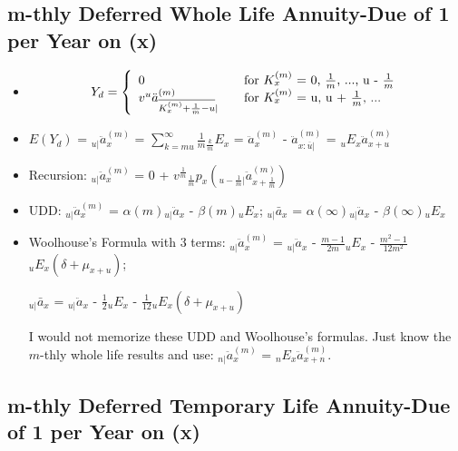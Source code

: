 \documentclass[]{book}
\begin{document}
\subsection{m-thly Deferred Whole Life Annuity-Due of 1 per Year on
(x)}\label{m-thly-deferred-whole-life-annuity-due-of-1-per-year-on-x}

\begin{itemize}
\item
  \[Y_d = \left\{
    \begin{array}{l l}
      0                       & \quad \text{for $K^{(m)}_x$ = 0, $\frac{1}{m}$, ..., u - $\frac{1}{m}$}\\
      v^u \ddot{a}^{(m)}_{\overline{K^{(m)}_x + \frac{1}{m} - u}| }             & \quad \text{for $K^{(m)}_x$ = u, u + $\frac{1}{m}$, ...}\\
    \end{array} \right.\]
\item
  \(E(Y_d)\) = \({}_{u|}\ddot{a}^{(m)}_x\) =
  \(\sum^{\infty}_{k = mu} \frac{1}{m} {}_{\frac{k}{m}}E_x\) =
  \(\ddot{a}^{(m)}_x\) - \(\ddot{a}^{(m)}_{x :\overline{u}|}\) =
  \({}_{u}E_x\)\(\ddot{a}^{(m)}_{x + u}\)
\item
  Recursion: \({}_{u|}\ddot{a}^{(m)}_x\) = 0 +
  \(v^{\frac{1}{m}}{}_{\frac{1}{m}}p_x({}_{u - \frac{1}{m}|}\ddot{a}^{(m)}_{x + \frac{1}{m}})\)
\item
  UDD: \({}_{u|}\ddot{a}^{(m)}_x\) = \(\alpha(m)\)\({}_{u|}\ddot{a}_x\)
  - \(\beta(m)\)\({}_{u}E_x\); \({}_{u|}\bar{a}_x\) =
  \(\alpha(\infty)\)\({}_{u|}\ddot{a}_x\) -
  \(\beta(\infty)\)\({}_{u}E_x\)
\item
  Woolhouse's Formula with 3 terms: \({}_{u|}\ddot{a}^{(m)}_x\) =
  \({}_{u|}\ddot{a}_x\) - \(\frac{m - 1}{2m}\)\({}_{u}E_x\) -
  \(\frac{m^2 - 1}{12m^2}\)\({}_{u}E_x(\delta + \mu_{x + u})\);

  \({}_{u|}\bar{a}_x\) = \({}_{u|}\ddot{a}_x\) -
  \(\frac{1}{2}\)\({}_{u}E_x\) -
  \(\frac{1}{12}\)\({}_{u}E_x(\delta + \mu_{x + u})\)

  I would not memorize these UDD and Woolhouse's formulas. Just know the
  \(m\)-thly whole life results and use: \({}_{n|}\ddot{a}^{(m)}_{x}\) =
  \({}_{n}E_x\)\(\ddot{a}^{(m)}_{x + n}\).
\end{itemize}

\subsection{m-thly Deferred Temporary Life Annuity-Due of 1 per Year on
(x)}\label{m-thly-deferred-temporary-life-annuity-due-of-1-per-year-on-x}
\end{document}
